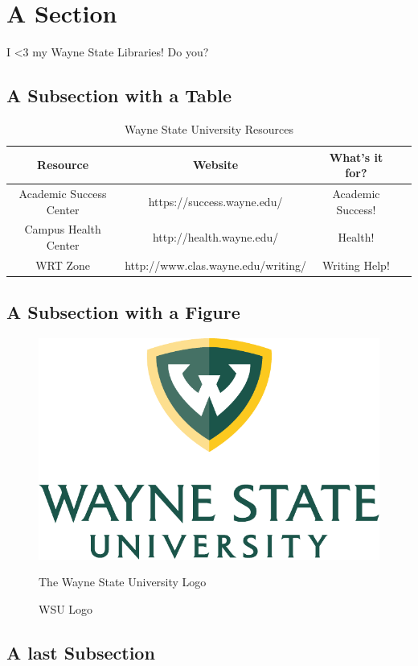 \section{A Section}
\label{chap:Introduction}

I <3 my Wayne State Libraries! Do you? \cite{WSULibrary}

\subsection{A Subsection with a Table}

\begin{table}[!h]
    \centering	
    \bgroup
    \def\arraystretch{1.00}
    \begin{tabular}{| c | c | c | c |}
          \hline			
          Resource & Website & What's it for? \\ \hline \hline \cline{1-3}
          Academic Success Center & https://success.wayne.edu/ & Academic Success!\\ \hline
          Campus Health Center & http://health.wayne.edu/ & Health! \\ \hline
          WRT Zone & http://www.clas.wayne.edu/writing/ & Writing Help!\\ \hline
    \end{tabular}
    \egroup
    \caption{Wayne State University Resources}
    \label{tab:WSUresources}
\end{table}

\subsection{A Subsection with a Figure}

\begin{figure}[!htbp]
    \centering
    \includegraphics[width=0.25\linewidth]{fig/wsu_primary_stacked_color.pdf}
    \caption{WSU Logo} The Wayne State University Logo
    \label{fig:WSUlogo}
\end{figure}

\subsection{A last Subsection}
